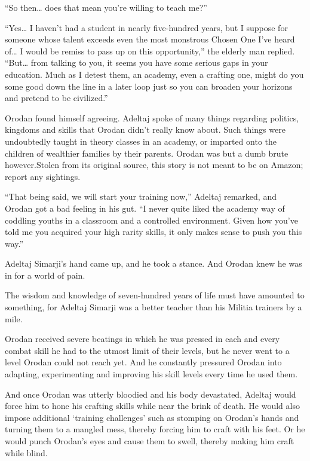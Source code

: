\documentclass[a4paper,10pt]{book}
\begin{document}
“So then… does that mean you’re willing to teach me?”\par
“Yes… I haven’t had a student in nearly five-hundred years, but I suppose for someone whose talent exceeds even the most monstrous Chosen One I’ve heard of… I would be remiss to pass up on this opportunity,” the elderly man replied. “But… from talking to you, it seems you have some serious gaps in your education. Much as I detest them, an academy, even a crafting one, might do you some good down the line in a later loop just so you can broaden your horizons and pretend to be civilized.”\par
Orodan found himself agreeing. Adeltaj spoke of many things regarding politics, kingdoms and skills that Orodan didn’t really know about. Such things were undoubtedly taught in theory classes in an academy, or imparted onto the children of wealthier families by their parents. Orodan was but a dumb brute however.Stolen from its original source, this story is not meant to be on Amazon; report any sightings.\par
“That being said, we will start your training now,” Adeltaj remarked, and Orodan got a bad feeling in his gut. “I never quite liked the academy way of coddling youths in a classroom and a controlled environment. Given how you’ve told me you acquired your high rarity skills, it only makes sense to push you this way.”\par
Adeltaj Simarji’s hand came up, and he took a stance. And Orodan knew he was in for a world of pain.\par
\par
The wisdom and knowledge of seven-hundred years of life must have amounted to something, for Adeltaj Simarji was a better teacher than his Militia trainers by a mile.\par
Orodan received severe beatings in which he was pressed in each and every combat skill he had to the utmost limit of their levels, but he never went to a level Orodan could not reach yet. And he constantly pressured Orodan into adapting, experimenting and improving his skill levels every time he used them.\par
And once Orodan was utterly bloodied and his body devastated, Adeltaj would force him to hone his crafting skills while near the brink of death. He would also impose additional ‘training challenges’ such as stomping on Orodan’s hands and turning them to a mangled mess, thereby forcing him to craft with his feet. Or he would punch Orodan’s eyes and cause them to swell, thereby making him craft while blind.\par
\end{document}

